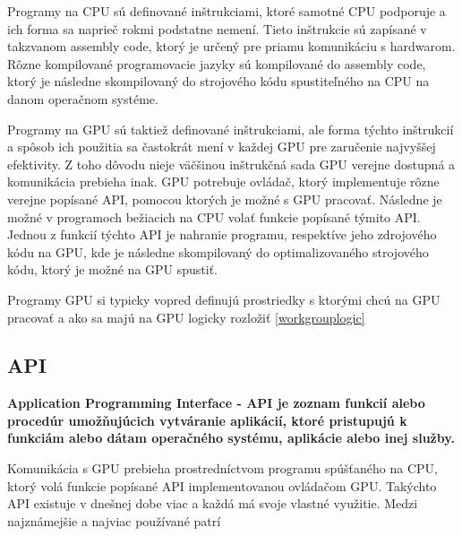 Programy na CPU sú definované inštrukciami, ktoré samotné CPU podporuje a ich forma sa naprieč rokmi podstatne nemení. Tieto inštrukcie sú zapísané v takzvanom assembly code, ktorý je určený pre priamu komunikáciu s hardwarom. Rôzne kompilované programovacie jazyky sú kompilované do assembly code, ktorý je následne skompilovaný do strojového kódu spustiteľného na CPU na danom operačnom systéme.

Programy na GPU sú taktiež definované inštrukciami, ale forma týchto inštrukcií a spôsob ich použitia sa častokrát mení v každej GPU pre zaručenie najvyššej efektivity. Z toho dôvodu nieje väčšinou inštrukčná sada GPU verejne dostupná a komunikácia prebieha inak. GPU potrebuje ovládač, ktorý implementuje rôzne verejne popísané API, pomocou ktorých je možné s GPU pracovať. Následne je možné v programoch bežiacich na CPU volať funkcie popísané týmito API. Jednou z funkcií týchto API je nahranie programu, respektíve jeho zdrojového kódu na GPU, kde je následne skompilovaný do optimalizovaného strojového kódu, ktorý je možné na GPU spustiť. 

Programy GPU si typicky vopred definujú prostriedky s ktorými chcú na GPU pracovať a ako sa majú na GPU logicky rozložiť \ref{workgrouplogic}

\subsection{API}

\bf Application Programming Interface - API \rm je zoznam funkcií alebo procedúr umožňujúcich vytváranie aplikácií, ktoré pristupujú k funkciám alebo dátam operačného systému, aplikácie alebo inej služby.

Komunikácia s GPU prebieha prostredníctvom programu spúšťaného na CPU, ktorý volá funkcie popísané API implementovanou ovládačom GPU. Takýchto API existuje v dnešnej dobe viac a každá má svoje vlastné využitie. Medzi najznámejšie a najviac používané patrí


